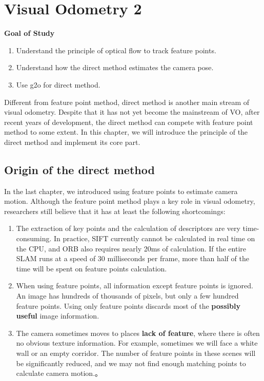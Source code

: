 \chapter{Visual Odometry 2}
\label{cpt:vo2}
\begin{mdframed}  
	\textbf{Goal of Study}
	\begin{enumerate}[labelindent=0em,leftmargin=1.5em]
		\item Understand the principle of optical flow to track feature points.
		\item Understand how the direct method estimates the camera pose.
		\item Use g2o for direct method.
	\end{enumerate}
\end{mdframed}

Different from feature point method, direct method is another main stream of visual odometry. Despite that it has not yet become the mainstream of VO, after recent years of development, the direct method can compete with feature point method to some extent. In this chapter, we will introduce the principle of the direct method and implement its core part.

\newpage


\newpage
\section{Origin of the direct method}
In the last chapter, we introduced using feature points to estimate camera motion. Although the feature point method plays a key role in visual odometry, researchers still believe that it has at least the following shortcomings:

\begin{enumerate}
	\item The extraction of key points and the calculation of descriptors are very time-consuming. In practice, SIFT currently cannot be calculated in real time on the CPU, and ORB also requires nearly 20ms of calculation. If the entire SLAM runs at a speed of 30 milliseconds per frame, more than half of the time will be spent on feature points calculation.

	\item When using feature points, all information except feature points is ignored. An image has hundreds of thousands of pixels, but only a few hundred feature points. Using only feature points discards most of the \textbf{possibly useful} image information. 
	
	\item The camera sometimes moves to places \textbf{lack of feature}, where there is often no obvious texture information. For example, sometimes we will face a white wall or an empty corridor. The number of feature points in these scenes will be significantly reduced, and we may not find enough matching points to calculate camera motion.。
\end{enumerate}

